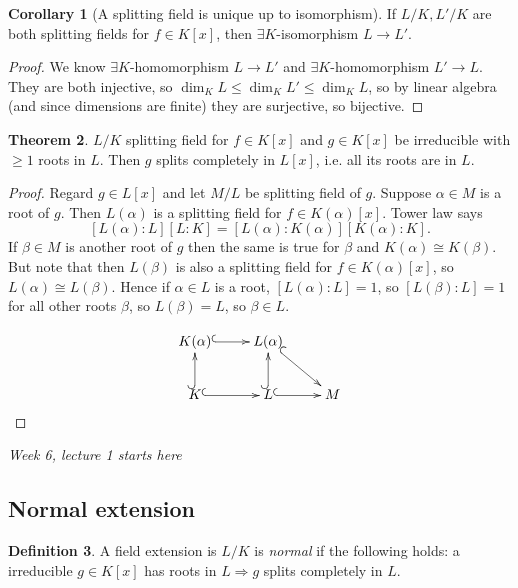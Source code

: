 \documentclass[a4paper]{article}
\theoremstyle{definition}
\newtheorem{defn}{Definition}[subsection]
\newtheorem{thm}[defn]{Theorem}
\newtheorem{coro}[defn]{Corollary}
\begin{document}
\begin{coro}[A splitting field is unique up to isomorphism]
\label{coro:splittingfieldsisomorphic}
If $L/K, L'/K$ are both splitting fields for $f\in K[x]$, then $\exists K$-isomorphism $L\rightarrow L'$.
\end{coro}
\begin{proof}
We know $\exists K$-homomorphism $L\rightarrow L'$ and $\exists K$-homomorphism $L'\rightarrow L$. They are both injective, so $\dim_K L\leq \dim_K L'\leq \dim_K L$, so by linear algebra (and since dimensions are finite) they are surjective, so bijective.
\end{proof}

\begin{thm}
\label{thm:splittingthennormal}
$L/K$ splitting field for $f\in K[x]$ and $g\in K[x]$ be irreducible with $\geq 1$ roots in $L$. Then $g$ splits completely in $L[x]$, i.e. all its roots are in $L$.
\end{thm}
\begin{proof}
Regard $g\in L[x]$ and let $M/L$ be splitting field of $g$. Suppose $\alpha\in M$ is a root of $g$. Then $L(\alpha)$ is a splitting field for $f\in K(\alpha)[x]$. Tower law says
\[
[L(\alpha):L][L:K]=[L(\alpha):K(\alpha)][K(\alpha):K].
\]
If $\beta\in M$ is another root of $g$ then the same is true for $\beta$ and $K(\alpha)\cong K(\beta)$. But note that then $L(\beta)$ is also a splitting field for $f\in K(\alpha)[x]$, so $L(\alpha)\cong L(\beta)$. Hence if $\alpha\in L$ is a root, $[L(\alpha):L]=1$, so $[L(\beta):L]=1$ for all other roots $\beta$, so $L(\beta)=L$, so $\beta \in L$.

\[
\xymatrix{
    K(\alpha) \ar@{^{(}->}[r] & L(\alpha) \ar@{^{(}->}[dr] \\
    K \ar@{^{(}->}[r] \ar@{^{(}->}[u] & L \ar@{^{(}->}[r] \ar@{^{(}->}[u] & M
}
\]
\end{proof}

\begin{flushright}
\textit{Week 6, lecture 1 starts here}
\end{flushright}

\subsection{Normal extension}

\begin{defn}
A field extension is $L/K$ is \textit{normal} if the following holds: a irreducible $g\in K[x]$ has roots in $L\Rightarrow g$ splits completely in $L$.
\end{defn}
\end{document}
